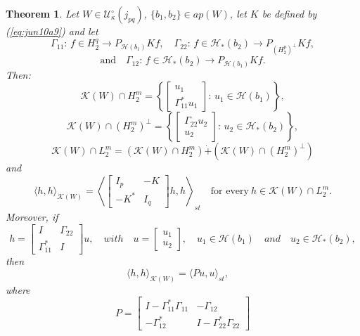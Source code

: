 \documentclass[12pt,twoside,a4paper]{amsart}
\newtheorem{thm}{Theorem}[section]
\theoremstyle{definition}
\numberwithin{equation}{section}
\begin{document}
\begin{thm}
\label{thm:jun2a9}
Let $W\in{{\mathcal U}}_\kappa^\circ(j_{pq})$, $\{b_1,b_2\}\in ap(W)$, let $K$ be
defined by (\ref{eq:jun10a9}) and let
$$
\Gamma_{11}:\,f\in H_2^q\longrightarrow P_{{{\mathcal H}}(b_1)}Kf,\quad
\Gamma_{22}:\,f\in {{\mathcal H}}_*(b_2)\longrightarrow
P_{(H_2^p)^\perp}Kf,
$$
$$
\textrm{and}\quad \Gamma_{12}:\,f\in {{\mathcal H}}_*(b_2)\longrightarrow
P_{{{\mathcal H}}(b_1)}Kf.
$$
Then:
\begin{equation}
\label{eq:jun3a9}
{{\mathcal K}}(W)\cap H_2^m=\left\{\begin{bmatrix}u_1\\ \Gamma_{11}^*u_1\end{bmatrix}:\,
u_1\in{{\mathcal H}}(b_1)\right\},
\end{equation}
\begin{equation}
\label{eq:jun3b9}
{{\mathcal K}}(W)\cap (H_2^m)^\perp=\left\{\begin{bmatrix}\Gamma_{22}u_2\\ u_2
\end{bmatrix}:\,u_2\in{{\mathcal H}}_*(b_2)\right\},
\end{equation}
\begin{equation}
\label{eq:jun3c9}
{{\mathcal K}}(W)\cap L_2^m=({{\mathcal K}}(W)\cap H_2^m)\dot{+}({{\mathcal K}}(W)\cap (H_2^m)^\perp)
\end{equation}
and
\begin{equation}
\label{eq:jun3d9}
\langle h,h\rangle_{{{\mathcal K}}(W)}=\left\langle \begin{bmatrix}I_p&-K\\-K^*&I_q
\end{bmatrix}h,h\right\rangle_{st}\quad\text{for every}\ h\in{{\mathcal K}}(W)\cap L_2^m.
\end{equation}
Moreover, if
\[
h=\left[\begin{array}{cc}
  I   &   \Gamma_{22}\\
  \Gamma_{11}^* &   I
\end{array}  \right]u,\quad with \quad u=\left[\begin{array}{cc}
  u_1\\
  u_2
\end{array}  \right],\quad u_1\in{{\mathcal H}}(b_1) \quad and \quad u_2\in{{\mathcal H}}_*(b_2),
\]
then
\begin{equation}\label{eq:Pinner}
    \langle h,h\rangle_{{{\mathcal K}}(W)}= \langle P u,u\rangle_{st}, \quad
\end{equation}
where
\begin{equation}\label{eq:Pick2}
   P=\left[\begin{array}{cc}
  I-\Gamma_{11}^*\Gamma_{11}   &   -\Gamma_{12}\\
  -\Gamma_{12}^* &   I-\Gamma_{22}^*\Gamma_{22}
\end{array}  \right]\end{equation}
\end{thm}
\end{document}
